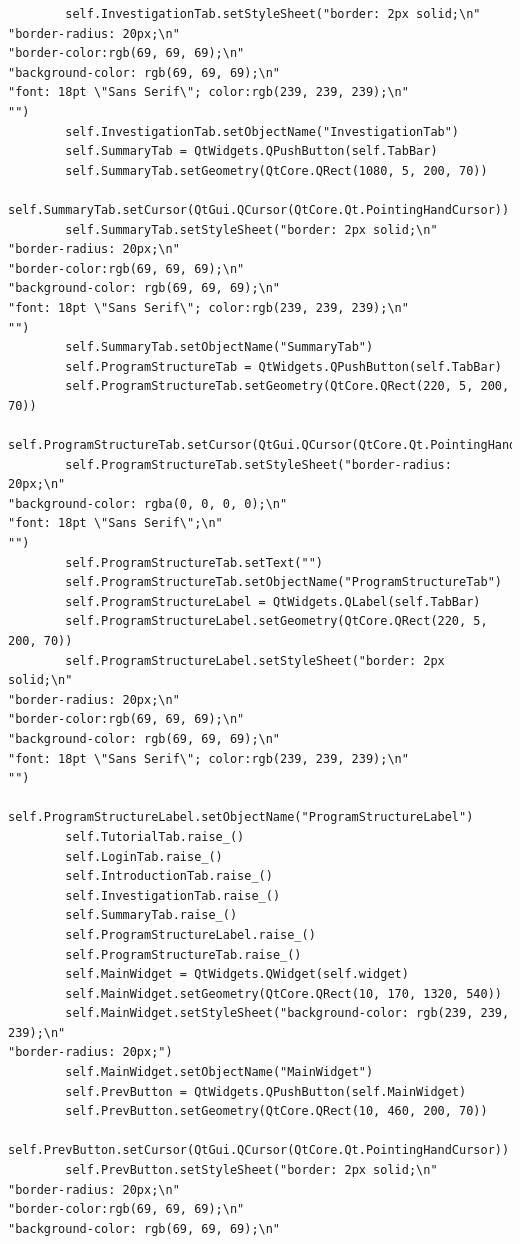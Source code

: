 \documentclass{article}
\begin{document}
\begin{lstlisting}
        self.InvestigationTab.setStyleSheet("border: 2px solid;\n"
"border-radius: 20px;\n"
"border-color:rgb(69, 69, 69);\n"
"background-color: rgb(69, 69, 69);\n"
"font: 18pt \"Sans Serif\"; color:rgb(239, 239, 239);\n"
"")
        self.InvestigationTab.setObjectName("InvestigationTab")
        self.SummaryTab = QtWidgets.QPushButton(self.TabBar)
        self.SummaryTab.setGeometry(QtCore.QRect(1080, 5, 200, 70))
        self.SummaryTab.setCursor(QtGui.QCursor(QtCore.Qt.PointingHandCursor))
        self.SummaryTab.setStyleSheet("border: 2px solid;\n"
"border-radius: 20px;\n"
"border-color:rgb(69, 69, 69);\n"
"background-color: rgb(69, 69, 69);\n"
"font: 18pt \"Sans Serif\"; color:rgb(239, 239, 239);\n"
"")
        self.SummaryTab.setObjectName("SummaryTab")
        self.ProgramStructureTab = QtWidgets.QPushButton(self.TabBar)
        self.ProgramStructureTab.setGeometry(QtCore.QRect(220, 5, 200, 70))
        self.ProgramStructureTab.setCursor(QtGui.QCursor(QtCore.Qt.PointingHandCursor))
        self.ProgramStructureTab.setStyleSheet("border-radius: 20px;\n"
"background-color: rgba(0, 0, 0, 0);\n"
"font: 18pt \"Sans Serif\";\n"
"")
        self.ProgramStructureTab.setText("")
        self.ProgramStructureTab.setObjectName("ProgramStructureTab")
        self.ProgramStructureLabel = QtWidgets.QLabel(self.TabBar)
        self.ProgramStructureLabel.setGeometry(QtCore.QRect(220, 5, 200, 70))
        self.ProgramStructureLabel.setStyleSheet("border: 2px solid;\n"
"border-radius: 20px;\n"
"border-color:rgb(69, 69, 69);\n"
"background-color: rgb(69, 69, 69);\n"
"font: 18pt \"Sans Serif\"; color:rgb(239, 239, 239);\n"
"")
        self.ProgramStructureLabel.setObjectName("ProgramStructureLabel")
        self.TutorialTab.raise_()
        self.LoginTab.raise_()
        self.IntroductionTab.raise_()
        self.InvestigationTab.raise_()
        self.SummaryTab.raise_()
        self.ProgramStructureLabel.raise_()
        self.ProgramStructureTab.raise_()
        self.MainWidget = QtWidgets.QWidget(self.widget)
        self.MainWidget.setGeometry(QtCore.QRect(10, 170, 1320, 540))
        self.MainWidget.setStyleSheet("background-color: rgb(239, 239, 239);\n"
"border-radius: 20px;")
        self.MainWidget.setObjectName("MainWidget")
        self.PrevButton = QtWidgets.QPushButton(self.MainWidget)
        self.PrevButton.setGeometry(QtCore.QRect(10, 460, 200, 70))
        self.PrevButton.setCursor(QtGui.QCursor(QtCore.Qt.PointingHandCursor))
        self.PrevButton.setStyleSheet("border: 2px solid;\n"
"border-radius: 20px;\n"
"border-color:rgb(69, 69, 69);\n"
"background-color: rgb(69, 69, 69);\n"

\end{lstlisting}
\end{document}
